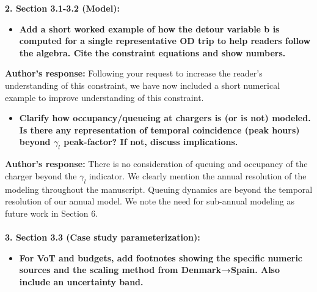 \documentclass[11pt]{article}
\begin{document}
\noindent\textbf{2. Section 3.1-3.2 (Model):}
\begin{itemize}
    \item[o] \textbf{Add a short worked example of how the detour variable b is computed for a single representative OD trip to help readers follow the algebra. Cite the constraint equations and show numbers.}
\end{itemize}
\color{authorblue}
\noindent \textcolor{authorblue}{\textbf{Author's response:}} Following your request to increase the reader's understanding of this constraint, we have now included a short numerical example to improve understanding of this constraint.
\color{reviewergrey}
\begin{itemize}
    \item[o]\textbf{ Clarify how occupancy/queueing at chargers is (or is not) modeled. Is there any representation of temporal coincidence (peak hours) beyond $\gamma_l$ peak-factor? If not, discuss implications.}
\end{itemize}
\color{authorblue}
\noindent \textcolor{authorblue}{\textbf{Author's response:}} There is no consideration of queuing and occupancy of the charger beyond the $\gamma_l$ indicator. We clearly mention the annual resolution of the modeling throughout the manuscript. Queuing dynamics are beyond the temporal resolution of our annual model. We note the need for sub-annual modeling as future work in Section 6.\\\\
\color{reviewergrey}
\textbf{3. Section 3.3 (Case study parameterization):}
\begin{itemize}
    \item[o] \textbf{For VoT and budgets, add footnotes showing the specific numeric sources and the scaling method from Denmark→Spain. Also include an uncertainty band.}
\end{itemize}
\end{document}
